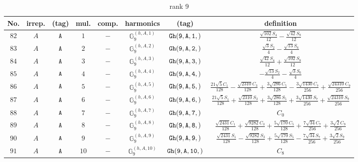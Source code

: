 \documentclass[fleqn,8pt]{jsarticle}
\begin{document}
\begin{table}[ht!]
\begin{center}
\caption{rank 9}
\renewcommand{\arraystretch}{1.3}
\begin{tabular}{cccccccc} \hline \hline
No. & irrep. & (tag) & mul. & comp. & harmonics & (tag) & definition \\ \hline
$ 82 $ & $ A $ & $ {\tt A} $ & $ 1 $ & $ - $ & $ \mathbb{G}_{9}^{(h,A,1)} $ & $ {\tt Gh(9,A,1,)} $ & $ \frac{\sqrt{102} S_{4}}{12} - \frac{\sqrt{42} S_{8}}{12} $ \\
$ 83 $ & $ A $ & $ {\tt A} $ & $ 2 $ & $ - $ & $ \mathbb{G}_{9}^{(h,A,2)} $ & $ {\tt Gh(9,A,2,)} $ & $ \frac{\sqrt{3} S_{2}}{4} - \frac{\sqrt{13} S_{6}}{4} $ \\
$ 84 $ & $ A $ & $ {\tt A} $ & $ 3 $ & $ - $ & $ \mathbb{G}_{9}^{(h,A,3)} $ & $ {\tt Gh(9,A,3,)} $ & $ \frac{\sqrt{42} S_{4}}{12} + \frac{\sqrt{102} S_{8}}{12} $ \\
$ 85 $ & $ A $ & $ {\tt A} $ & $ 4 $ & $ - $ & $ \mathbb{G}_{9}^{(h,A,4)} $ & $ {\tt Gh(9,A,4,)} $ & $ - \frac{\sqrt{13} S_{2}}{4} - \frac{\sqrt{3} S_{6}}{4} $ \\
$ 86 $ & $ A $ & $ {\tt A} $ & $ 5 $ & $ - $ & $ \mathbb{G}_{9}^{(h,A,5)} $ & $ {\tt Gh(9,A,5,)} $ & $ \frac{21 \sqrt{5} C_{1}}{128} - \frac{\sqrt{2310} C_{3}}{128} + \frac{3 \sqrt{286} C_{5}}{128} - \frac{3 \sqrt{1430} C_{7}}{256} + \frac{\sqrt{24310} C_{9}}{256} $ \\
$ 87 $ & $ A $ & $ {\tt A} $ & $ 6 $ & $ - $ & $ \mathbb{G}_{9}^{(h,A,6)} $ & $ {\tt Gh(9,A,6,)} $ & $ \frac{21 \sqrt{5} S_{1}}{128} + \frac{\sqrt{2310} S_{3}}{128} + \frac{3 \sqrt{286} S_{5}}{128} + \frac{3 \sqrt{1430} S_{7}}{256} + \frac{\sqrt{24310} S_{9}}{256} $ \\
$ 88 $ & $ A $ & $ {\tt A} $ & $ 7 $ & $ - $ & $ \mathbb{G}_{9}^{(h,A,7)} $ & $ {\tt Gh(9,A,7,)} $ & $ C_{0} $ \\
$ 89 $ & $ A $ & $ {\tt A} $ & $ 8 $ & $ - $ & $ \mathbb{G}_{9}^{(h,A,8)} $ & $ {\tt Gh(9,A,8,)} $ & $ \frac{\sqrt{2431} C_{1}}{128} + \frac{\sqrt{9282} C_{3}}{128} + \frac{5 \sqrt{170} C_{5}}{128} + \frac{7 \sqrt{34} C_{7}}{256} + \frac{3 \sqrt{2} C_{9}}{256} $ \\
$ 90 $ & $ A $ & $ {\tt A} $ & $ 9 $ & $ - $ & $ \mathbb{G}_{9}^{(h,A,9)} $ & $ {\tt Gh(9,A,9,)} $ & $ \frac{\sqrt{2431} S_{1}}{128} - \frac{\sqrt{9282} S_{3}}{128} + \frac{5 \sqrt{170} S_{5}}{128} - \frac{7 \sqrt{34} S_{7}}{256} + \frac{3 \sqrt{2} S_{9}}{256} $ \\
$ 91 $ & $ A $ & $ {\tt A} $ & $ 10 $ & $ - $ & $ \mathbb{G}_{9}^{(h,A,10)} $ & $ {\tt Gh(9,A,10,)} $ & $ C_{8} $ \\

\end{tabular}
\end{center}
\end{table}
\end{document}
